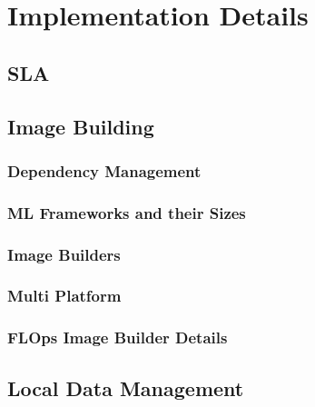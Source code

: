 \chapter{Implementation Details}

\section{SLA}

\section{Image Building}

    \subsection{Dependency Management}

    \subsection{ML Frameworks and their Sizes}

    \subsection{Image Builders}

    \subsection{Multi Platform}

    \subsection{FLOps Image Builder Details}

\section{Local Data Management}

